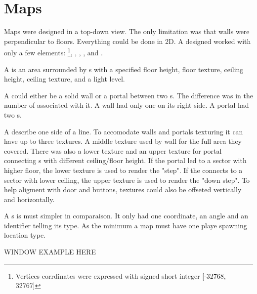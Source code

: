 

\section{Maps}
Maps were designed in a top-down view. The only limitation was that walls were perpendicular to floors. Everything could be done in 2D. A designed worked with only a few elements: \footnote{Vertices corrdinates were expressed with signed short integer [-32768, 32767]}, , , , and .\\
\par
{}
\par
A  is an area surrounded by s with a specified floor height, floor texture, ceiling height, ceiling texture, and a light level.\\
\par
A  could either be a solid wall or a portal between two s. The difference was in the number of  associated with it. A wall had only one  on its right side. A portal had two s.\\
\par
A  describe one side of a line. To accomodate walls and portals texturing it can have up to three textures. A middle texture used by wall for the full area they covered. There was also a lower texture and an upper texture for portal connecting s with different ceiling/floor height. If the portal led to a sector with higher floor, the lower texture is used to render the "step". If the  connects to a sector with lower ceiling, the upper texture is used to render the "down step". To help aligment with door and buttons,  textures could also be offseted vertically and horizontally.\\
\par
A s is must simpler in comparaison. It only had one  coordinate, an angle and an identifier telling its type. As the minimum a map must have one playe spawning location  type. 

WINDOW EXAMPLE HERE\\
\par
\pagebreak



